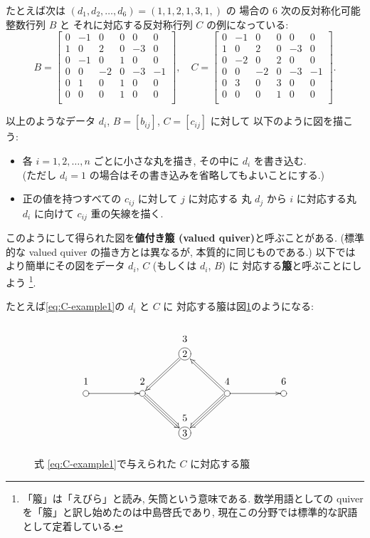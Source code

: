\documentclass[12pt,twoside,dvipdfm]{jarticle}
\theoremstyle{definition} %
\theoremstyle{definition} %
\theoremstyle{definition} %
\numberwithin{theorem}{section}
\numberwithin{equation}{section}
\numberwithin{figure}{section}
\numberwithin{table}{section}
\newcommand\figureref[1]{図\ref{#1}}
\newcommand\figref[1]{\figureref{#1}}
\begin{document}
たとえば次は $(d_1,d_2,\ldots,d_6)=(1,1,2,1,3,1,)$ の
場合の $6$ 次の反対称化可能整数行列 $B$ と
それに対応する反対称行列 $C$ の例になっている:
\begin{equation}
 B = 
 \begin{bmatrix}
   0 &-1 & 0 & 0 & 0 & 0 \\
   1 & 0 & 2 & 0 &-3 & 0 \\
   0 &-1 & 0 & 1 & 0 & 0 \\
   0 & 0 &-2 & 0 &-3 &-1 \\
   0 & 1 & 0 & 1 & 0 & 0 \\
   0 & 0 & 0 & 1 & 0 & 0 \\
 \end{bmatrix},
 \quad
 C = 
 \begin{bmatrix}
   0 &-1 & 0 & 0 & 0 & 0 \\
   1 & 0 & 2 & 0 &-3 & 0 \\
   0 &-2 & 0 & 2 & 0 & 0 \\
   0 & 0 &-2 & 0 &-3 &-1 \\
   0 & 3 & 0 & 3 & 0 & 0 \\
   0 & 0 & 0 & 1 & 0 & 0 \\
 \end{bmatrix}.
 \label{eq:C-example1}
\end{equation}

以上のようなデータ $d_i$, $B=[b_{ij}]$, $C=[c_{ij}]$ に対して
以下のように図を描こう:
\begin{itemize}
\item 各 $i=1,2,\ldots,n$ ごとに小さな丸を描き, その中に $d_i$ を書き込む.
\\ (ただし $d_i=1$ の場合はその書き込みを省略してもよいことにする.)
\item 正の値を持つすべての $c_{ij}$ に対して $j$ に対応する
丸 $d_j$ から $i$ に対応する丸 $d_i$ に向けて $c_{ij}$ 重の矢線を描く.
\end{itemize}
このようにして得られた図を{\bf 値付き箙 (valued quiver)}と呼ぶことがある.
(標準的な valued quiver の描き方とは異なるが, 本質的に同じものである.)
以下ではより簡単にその図をデータ $d_i$, $C$ (もしくは $d_i$, $B$) に
対応する{\bf 箙}と呼ぶことにしよう%
\footnote{「箙」は「えびら」と読み, 矢筒という意味である.
数学用語としての quiver を「箙」と訳し始めたのは中島啓氏であり, 
現在この分野では標準的な訳語として定着している.}.

たとえば\eqref{eq:C-example1}の $d_i$ と $C$ に
対応する箙は\figref{fig:-<>-}のようになる:

\begin{figure}[hbtp!]
\[
\begin{xy}
 ( 0,20) *+[Fo]{} ="1"*+++!D{1},
 (20,20) *+[Fo]{} ="2"*+++!D{2},
 (35, 6) *+[Fo]{3}="5"*++++!D{5},
 (35,34) *+[Fo]{2}="3"*++++!D{3},
 (50,20) *+[Fo]{} ="4"*+++!D{4},
 (70,20) *+[Fo]{} ="6"*+++!D{6},
 \ar@{->}"1";"2",
 \ar@2{->}"3";"2",
 \ar@3{->}"2";"5",
 \ar@2{->}"4";"3",
 \ar@3{->}"4";"5",
 \ar@{->}"4";"6"
\end{xy}
\]
\caption{式 \eqref{eq:C-example1}で与えられた $C$ に対応する箙}
\label{fig:-<>-}
\end{figure}
\end{document}
